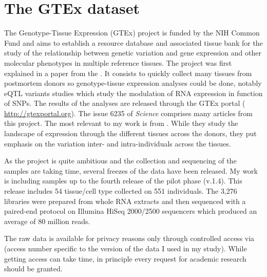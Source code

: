 \chapter{The GTEx dataset}
\label{ch:gtexData}




The Genotype-Tissue Expression (\gls{GTEx}) project is funded by the NIH Common
Fund and aims to establish a resource database and associated tissue bank
for the study of the relationship between genetic variation and gene expression
and other molecular phenotypes in multiple reference tissues. The project was first
explained in a paper from the \cite{GTEx2013}. It consists to quickly collect
many tissues from postmortem donors so genotype-tissue expression analyses could
be done, notably \gls{eQTL} variants studies which study the modulation
of \gls{RNA} expression in function of \glspl{SNP}. The results of the
analyses are released through the GTEx portal (%
\href{http://gtexportal.org}{http://gtexportal.org}). The issue 6235 of
\emph{Science} comprises
many articles from this project. The most relevant to my work is
 from \cite{GTExTranscript}. While they study
the landscape of expression through the different tissues across the donors, they
put emphasis on the variation inter- and intra-individuals across the tissues.

As the project is quite ambitious and the collection and sequencing of the samples
are taking time, several freezes of the data have been released. My work is
including samples up to the fourth release of the pilot phase (v.1.4). This
release includes 54 tissue/cell type collected on 551 individuals.
The 3,276 libraries were prepared from whole \gls{RNA} extracts and then sequenced
with a paired-end protocol on Illumina HiSeq 2000/2500 sequencers which produced
an average of 80 million reads.

The raw data is available for privacy reasons only through controlled access via
 (access number specific to the version of the data I used
in my study). While getting access can take time, in principle every request for
academic research should be granted.
